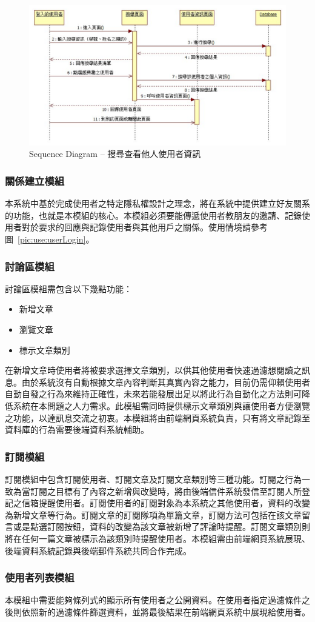 \begin{figure}[H]
\centering
\includegraphics[width=\textwidth]{img/seq03.png}
\caption{Sequence Diagram -- 搜尋查看他人使用者資訊}
\label{pic:seq:searchUser}
\end{figure}

\subsubsection{關係建立模組}
\label{sssec:following}
本系統中基於完成使用者之特定隱私權設計之理念，將在系統中提供建立好友關系的功能，也就是本模組的核心。本模組必須要能傳遞使用者教朋友的邀請、記錄使用者對於要求的回應與記錄使用者與其他用戶之關係。使用情境請參考圖~\ref{pic:use:userLogin}。

\subsubsection{討論區模組}
討論區模組需包含以下幾點功能：
\begin{itemize}
\item 新增文章
\item 瀏覽文章
\item 標示文章類別
\end{itemize}
在新增文章時使用者將被要求選擇文章類別，以供其他使用者快速過濾想閱讀之訊息。由於系統沒有自動根據文章內容判斷其真實內容之能力，目前仍需仰賴使用者自動自發之行為來維持正確性，未來若能發展出足以將此行為自動化之方法則可降低系統在本問題之人力需求。此模組需同時提供標示文章類別與讓使用者方便瀏覽之功能，以達訊息交流之初衷。本模組將由前端網頁系統負責，只有將文章記錄至資料庫的行為需要後端資料系統輔助。

\subsubsection{訂閱模組}
\label{sssec:subscription}
訂閱模組中包含訂閱使用者、訂閱文章及訂閱文章類別等三種功能。訂閱之行為一致為當訂閱之目標有了內容之新增與改變時，將由後端信件系統發信至訂閱人所登記之信箱提醒使用者。訂閱使用者的訂閱對象為本系統之其他使用者，資料的改變為新增文章等行為。訂閱文章的訂閱隊項為單篇文章，訂閱方法可包括在該文章留言或是點選訂閱按鈕，資料的改變為該文章被新增了評論時提醒。訂閱文章類別則將在任何一篇文章被標示為該類別時提醒使用者。本模組需由前端網頁系統展現、後端資料系統記錄與後端郵件系統共同合作完成。


\subsubsection{使用者列表模組}
本模組中需要能夠條列式的顯示所有使用者之公開資料。在使用者指定過濾條件之後則依照新的過濾條件篩選資料，並將最後結果在前端網頁系統中展現給使用者。

